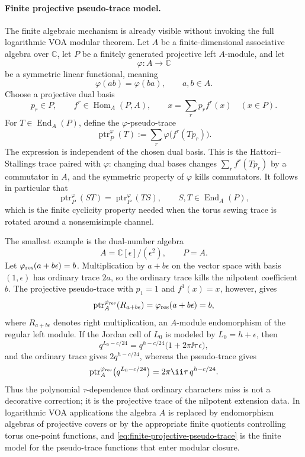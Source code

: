 \paragraph{Finite projective pseudo-trace model.}
The finite algebraic mechanism is already visible without invoking the full
logarithmic VOA modular theorem.  Let \(A\) be a finite-dimensional
associative algebra over \(\mathbb C\), let \(P\) be a finitely generated
projective left \(A\)-module, and let
\[
  \varphi:A\longrightarrow\mathbb C
\]
be a symmetric linear functional, meaning
\[
  \varphi(ab)=\varphi(ba),\qquad a,b\in A .
\]
Choose a projective dual basis
\[
  p_r\in P,\qquad f^r\in\operatorname{Hom}_A(P,A),\qquad
  x=\sum_r p_r f^r(x)\quad (x\in P).
\]
For \(T\in\operatorname{End}_A(P)\), define the
\(\varphi\)-pseudo-trace
\begin{equation}
  \operatorname{ptr}_{P}^{\varphi}(T)
  :=
  \sum_r
  \varphi\bigl(f^r(Tp_r)\bigr).
  \label{eq:finite-projective-pseudo-trace}
\end{equation}
The expression is independent of the chosen dual basis.  This is the
Hattori--Stallings trace paired with \(\varphi\): changing dual bases changes
\(\sum_r f^r(Tp_r)\) by a commutator in \(A\), and the symmetric property of
\(\varphi\) kills commutators.  It follows in particular that
\[
  \operatorname{ptr}_{P}^{\varphi}(ST)
  =
  \operatorname{ptr}_{P}^{\varphi}(TS),
  \qquad
  S,T\in\operatorname{End}_A(P),
\]
which is the finite cyclicity property needed when the torus sewing trace is
rotated around a nonsemisimple channel.

The smallest example is the dual-number algebra
\[
  A=\mathbb C[\epsilon]/(\epsilon^2),
  \qquad
  P=A .
\]
Let \(\varphi_{\rm res}(a+b\epsilon)=b\).  Multiplication by
\(a+b\epsilon\) on the vector space with basis \((1,\epsilon)\) has ordinary
trace \(2a\), so the ordinary trace kills the nilpotent coefficient \(b\).
The projective pseudo-trace with \(p_1=1\) and \(f^1(x)=x\), however, gives
\[
  \operatorname{ptr}^{\varphi_{\rm res}}_{A}(R_{a+b\epsilon})
  =
  \varphi_{\rm res}(a+b\epsilon)
  =
  b ,
\]
where \(R_{a+b\epsilon}\) denotes right multiplication, an \(A\)-module
endomorphism of the regular left module.  If the Jordan cell of \(L_0\) is
modeled by \(L_0=h+\epsilon\), then
\[
  q^{L_0-c/24}
  =
  q^{h-c/24}\bigl(1+2\pi\ii\tau\,\epsilon\bigr),
\]
and the ordinary trace gives \(2q^{h-c/24}\), whereas the pseudo-trace gives
\[
  \operatorname{ptr}^{\varphi_{\rm res}}_{A}
  \bigl(q^{L_0-c/24}\bigr)
  =
  2\pi\ii\tau\,q^{h-c/24}.
\]
Thus the polynomial \(\tau\)-dependence that ordinary characters miss is not a
decorative correction; it is the projective trace of the nilpotent extension
data.  In logarithmic VOA applications the algebra \(A\) is replaced by
endomorphism algebras of projective covers or by the appropriate finite
quotients controlling torus one-point functions, and
\eqref{eq:finite-projective-pseudo-trace} is the finite model for the
pseudo-trace functions that enter modular closure.

